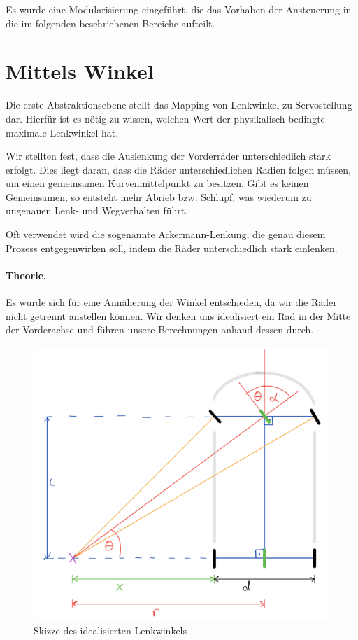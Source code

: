 \documentclass[a4paper,12pt]{report}
\begin{document}
	Es wurde eine Modularisierung eingeführt, die das Vorhaben der Ansteuerung in die im folgenden beschriebenen Bereiche aufteilt.
	
\section{Mittels Winkel}
\label{Steering-Angle-To-Servo}

	Die erste Abstraktionsebene stellt das Mapping von Lenkwinkel zu Servostellung dar.
	Hierfür ist es nötig zu wissen, welchen Wert der physikalisch bedingte maximale Lenkwinkel hat.
	
	Wir stellten fest, dass die Auslenkung der Vorderräder unterschiedlich stark erfolgt.
	Dies liegt daran, dass die Räder unterschiedlichen Radien folgen müssen, um einen gemeinsamen Kurvenmittelpunkt zu besitzen.
	Gibt es keinen Gemeinsamen, so entsteht mehr Abrieb bzw. Schlupf, was wiederum zu ungenauen Lenk- und Wegverhalten führt.
	
	Oft verwendet wird die sogenannte Ackermann-Lenkung, die genau diesem Prozess entgegenwirken soll, indem die Räder unterschiedlich stark einlenken.
	
	\paragraph{Theorie.}
	Es wurde sich für eine Annäherung der Winkel entschieden, da wir die Räder nicht getrennt anstellen können.
	Wir denken uns idealisiert ein Rad in der Mitte der Vorderachse und führen unsere Berechnungen anhand dessen durch.
	
	\begin{figure}[ht]
		\centering
		\includegraphics[width=\textwidth,height=\textheight,keepaspectratio]{assets/Lenkwinkel-Skizze.png}
		\caption{Skizze des idealisierten Lenkwinkels}
		\label{img-steering-angles-sketch}
	\end{figure}
	\pagebreak
	
\end{document}
